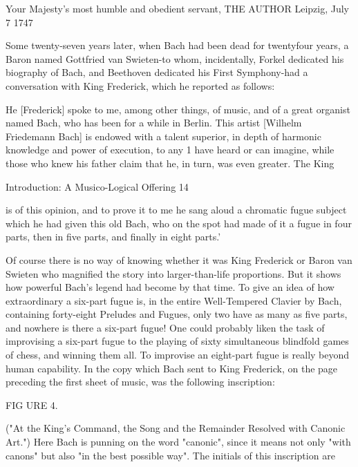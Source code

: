                                              Your Majesty's
                                                   most humble and obedient servant,
                                                           THE AUTHOR
Leipzig, July 7 1747

  Some twenty-seven years later, when Bach had been dead for twentyfour years, a Baron
named Gottfried van Swieten-to whom, incidentally, Forkel dedicated his biography of
Bach, and Beethoven dedicated his First Symphony-had a conversation with King
Frederick, which he reported as follows:

  He [Frederick] spoke to me, among other things, of music, and of a great organist
  named Bach, who has been for a while in Berlin. This artist [Wilhelm Friedemann
  Bach] is endowed with a talent superior, in depth of harmonic knowledge and power
  of execution, to any 1 have heard or can imagine, while those who knew his father
  claim that he, in turn, was even greater. The King



Introduction: A Musico-Logical Offering                                                   14

   is of this opinion, and to prove it to me he sang aloud a chromatic fugue subject which
   he had given this old Bach, who on the spot had made of it a fugue in four parts, then
   in five parts, and finally in eight parts.'

   Of course there is no way of knowing whether it was King Frederick or Baron van
Swieten who magnified the story into larger-than-life proportions. But it shows how
powerful Bach's legend had become by that time. To give an idea of how extraordinary a
six-part fugue is, in the entire Well-Tempered Clavier by Bach, containing forty-eight
Preludes and Fugues, only two have as many as five parts, and nowhere is there a six-part
fugue! One could probably liken the task of improvising a six-part fugue to the playing of
sixty simultaneous blindfold games of chess, and winning them all. To improvise an
eight-part fugue is really beyond human capability.
   In the copy which Bach sent to King Frederick, on the page preceding the first sheet of
music, was the following inscription:




FIG URE 4.

("At the King's Command, the Song and the Remainder Resolved with Canonic Art.")
Here Bach is punning on the word "canonic", since it means not only "with canons" but
also "in the best possible way". The initials of this inscription are

